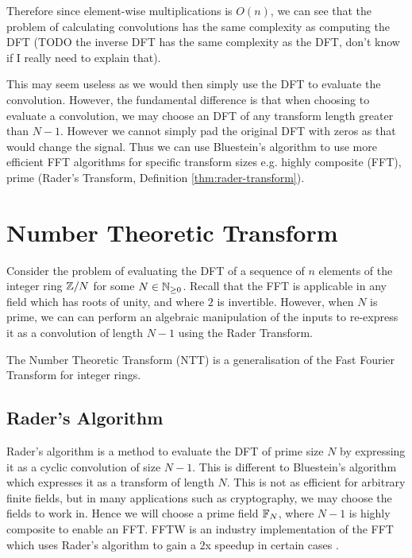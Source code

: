 Therefore since element-wise multiplications is $O(n)$, we can see that the problem of calculating convolutions has the same complexity as computing the DFT (TODO the inverse DFT has the same complexity as the DFT, don't know if I really need to explain that).

This may seem useless as we would then simply use the DFT to evaluate the convolution. However, the fundamental difference is that when choosing to evaluate a convolution, we may choose an DFT of any transform length greater than $N - 1$. However we cannot simply pad the original DFT with zeros as that would change the signal. Thus we can use Bluestein's algorithm\cite{bluestein} to use more efficient FFT algorithms for specific transform sizes e.g. highly composite (FFT), prime (Rader's Transform, Definition \ref{thm:rader-transform}).

\section{Number Theoretic Transform}
\label{sec:ntt}


Consider the problem of evaluating the DFT of a sequence of $n$ elements of the integer ring ${\mathbb Z}/N$ for some $N \in {\mathbb N}_{\ge 0}$. Recall that the FFT is applicable in any field which has roots of unity, and where $2$ is invertible. However, when $N$ is prime, we can can perform an algebraic manipulation of the inputs to re-express it as a convolution of length $N-1$ using the Rader Transform.

The Number Theoretic Transform (NTT) is a generalisation of the Fast Fourier Transform for integer rings.

\subsection{Rader's Algorithm}
\label{subsec:rt}

Rader's algorithm is a method to evaluate the DFT of prime size $N$ by expressing it as a cyclic convolution of size $N - 1$. This is different to Bluestein's algorithm which expresses it as a transform of length $N$. This is not as efficient for arbitrary finite fields, but in many applications such as cryptography, we may choose the fields to work in. Hence we will choose a prime field ${\mathbb F}_N$, where $N - 1$ is highly composite to enable an FFT. FFTW is an industry implementation of the FFT which uses Rader's algorithm to gain a $2$x speedup in certain cases \cite{fftw}.

